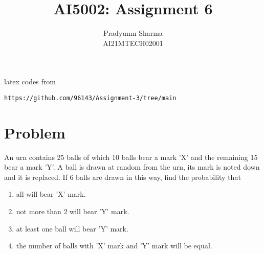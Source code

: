 \documentclass[journal,12pt,twocolumn]{IEEEtran}
\begin{document}
\let\vec\mathbf
\renewcommand{\thefigure}{\theproblem}
\def\putbox#1#2#3{\makebox[0in][l]{\makebox[#1][l]{}\raisebox{\baselineskip}[0in][0in]{\raisebox{#2}[0in][0in]{#3}}}}
     \def\rightbox#1{\makebox[0in][r]{#1}}
     \def\centbox#1{\makebox[0in]{#1}}
     \def\topbox#1{\raisebox{-\baselineskip}[0in][0in]{#1}}
     \def\midbox#1{\raisebox{-0.5\baselineskip}[0in][0in]{#1}}
\vspace{3cm}
\title{AI5002: Assignment 6}
\author{Pradyumn Sharma\\ AI21MTECH02001}
\maketitle
\newpage
\bigskip
\renewcommand{\thefigure}{\theenumi}
\renewcommand{\thetable}{\theenumi}
%
latex codes from 
%
\begin{lstlisting}
https://github.com/96143/Assignment-3/tree/main
\end{lstlisting}
\section{Problem}
An urn contains 25 balls of which 10 balls
bear a mark ’X’ and the remaining 15 bear a
mark ’Y’. A ball is drawn at random from the
urn, its mark is noted down and it is replaced.
If 6 balls are drawn in this way, find the
probability that
\begin{enumerate}
    \item  all will bear ’X’ mark.
    \item  not more than 2 will bear ’Y’ mark.
    \item  at least one ball will bear ’Y’ mark.
    \item  the number of balls with ’X’ mark and
’Y’ mark will be equal.
\end{enumerate}
\end{document}
